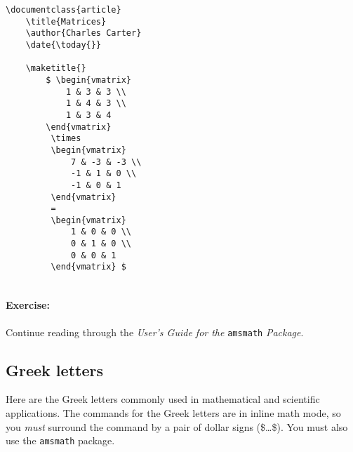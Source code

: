         \begin{verbatim}
\documentclass{article}
    \title{Matrices}
    \author{Charles Carter}
    \date{\today{}}
 
    \maketitle{}
        $ \begin{vmatrix}
            1 & 3 & 3 \\
            1 & 4 & 3 \\
            1 & 3 & 4 
        \end{vmatrix}
         \times 
         \begin{vmatrix}
             7 & -3 & -3 \\
             -1 & 1 & 0 \\
             -1 & 0 & 1
         \end{vmatrix}
         =
         \begin{vmatrix}
             1 & 0 & 0 \\
             0 & 1 & 0 \\
             0 & 0 & 1
         \end{vmatrix} $
    
        \end{verbatim}

		\paragraph{Exercise:}Continue reading through the \textit{User's Guide for the }\texttt{amsmath} \textit{Package}.

        \subsection{Greek letters}
        \label{Greek letters}
        

        Here are the Greek letters commonly used in mathematical and scientific applications. The \LaTeXe{} commands for the Greek letters are in inline math mode, so you \textit{must} surround the command by a pair of dollar signs (\$\ldots\$). You must also use the \texttt{amsmath} package.


